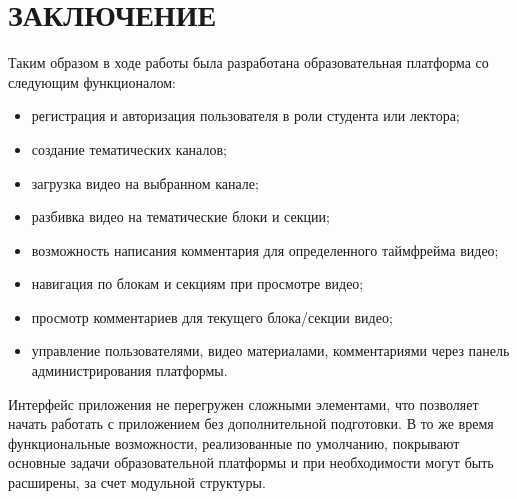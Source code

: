 \section*{ЗАКЛЮЧЕНИЕ}

Таким образом в ходе работы была разработана образовательная платформа со следующим функционалом:
\begin{itemize}
  \item регистрация и авторизация пользователя в роли студента или лектора;
  \item создание тематических каналов;
  \item загрузка видео на выбранном канале;
  \item разбивка видео на тематические блоки и секции;
  \item возможность написания комментария для определенного таймфрейма видео;
  \item навигация по блокам и секциям при просмотре видео;
  \item просмотр комментариев для текущего блока/секции видео;
  \item управление пользователями, видео материалами, комментариями через панель администрирования платформы.
\end{itemize}

Интерфейс приложения не перегружен сложными элементами, что позволяет начать работать с приложением
без дополнительной подготовки. В то же время функциональные возможности, реализованные
по умолчанию, покрывают основные задачи образовательной платформы и при необходимости могут быть
расширены, за счет модульной структуры.